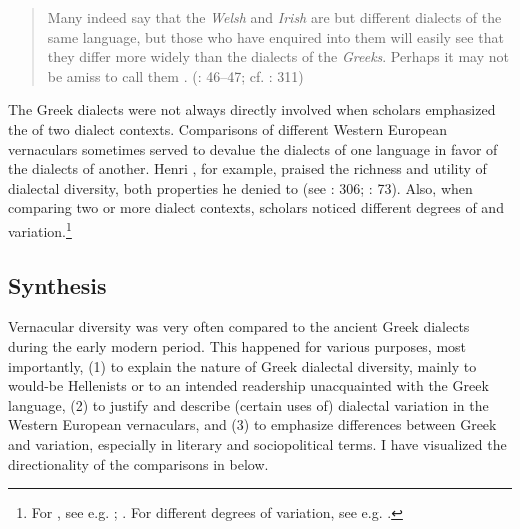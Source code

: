 \begin{quote}
Many indeed say that the \textit{Welsh} and \textit{Irish} are but different dialects of the same language, but those who have enquired into them will easily see that they differ more widely than the dialects of the \textit{Greeks}. Perhaps it may not be amiss to call them . (\citealt{Malcolm1738}: 46–47; cf. \citealt{Macnicol1779}: 311)
\end{quote}

The Greek dialects were not always directly involved when scholars emphasized the  of two dialect contexts. Comparisons of different Western European vernaculars sometimes served to devalue the dialects of one language in favor of the dialects of another. Henri \citet[133--134]{Estienne1579}, for example, praised the richness and utility of  dialectal diversity, both properties he denied to  (see \citealt{Swiggers1997}: 306; \citeyear{Swiggers2009}: 73). Also, when comparing two or more  dialect contexts, scholars noticed different degrees of  and variation.\footnote{For , see e.g. \citet[158\textsc{\textsuperscript{r}}\textsc{–158}\textsc{\textsuperscript{v}}]{Hosius1560}; \citet[77 – I refer to the  translation of the  original, published in 1746/1747]{Hogstrom1748}. For different degrees of variation, see e.g. \citet[27, 57]{Sajnovics1770}.}

\subsection{Synthesis}

Vernacular diversity was very often compared to the ancient Greek dialects during the early modern period. This happened for various purposes, most importantly, (1) to explain the nature of Greek dialectal diversity, mainly to would-be Hellenists or to an intended readership unacquainted with the Greek language, (2) to justify and describe (certain uses of) dialectal variation in the Western European vernaculars, and (3) to emphasize differences between Greek and  variation, especially in literary and sociopolitical terms. I have visualized the directionality of the comparisons in  below.

